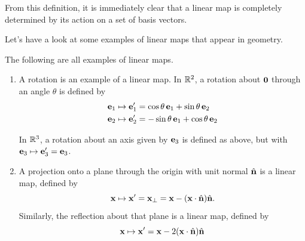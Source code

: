 \documentclass[a4paper]{scrartcl}
\begin{document}
From this definition, it is immediately clear that a linear map is completely determined by its action on a set of basis vectors.

Let's have a look at some examples of linear maps that appear in geometry.

\begin{example}
The following are all examples of linear maps.
\begin{enumerate}[label=(\roman*)]
    \item A rotation is an example of a linear map. In $\mathbb{R}^2$, a rotation about $\mathbf{0}$ through an angle $\theta$ is defined by
    \begin{align*}
        \mathbf{e}_1 \mapsto \mathbf{e}_1' &= \cos \theta \, \mathbf{e}_1 + \sin \theta \, \mathbf{e}_2 \\
        \mathbf{e}_2 \mapsto \mathbf{e}_2' &= -\sin \theta \, \mathbf{e}_1 + \cos \theta \, \mathbf{e}_2
    \end{align*}
    
    \begin{center}
      \end{center}
    
      In $\mathbb{R}^3$, a rotation about an axis given by $\mathbf{e}_3$ is defined as above, but with $\mathbf{e}_3 \mapsto \mathbf{e}_3'= \mathbf{e}_3$.

      \item A projection onto a plane through the origin with unit normal $\hat{\mathbf{n}}$ is a linear map, defined by
      $$
      \mathbf{x} \mapsto \mathbf{x}'= \mathbf{x}_{\perp} = \mathbf{x} - (\mathbf{x} \cdot \hat{\mathbf{n}}) \hat{\mathbf{n}}.
        $$
        Similarly, the reflection about that plane is a linear map, defined by
        $$
        \mathbf{x} \mapsto \mathbf{x}' = \mathbf{x} - 2(\mathbf{x} \cdot \hat{\mathbf{n}}) \hat{\mathbf{n}}
        $$


\end{enumerate}
\end{example}
\end{document}
